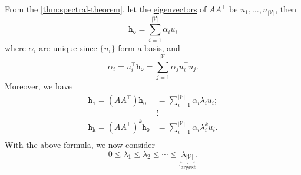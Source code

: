 From the \autoref{thm:spectral-theorem}, let the \hyperref[def:eigenvector]{eigenvectors} of \(A A^{\top} \) be \(u_1, \ldots , u_{\left\vert \mathcal{V} \right\vert } \), then
\[
	\mathtt{h_0} = \sum\limits_{i=1}^{\left\vert \mathcal{V} \right\vert } \alpha_i u_{i}
\]
where \(\alpha_{i}\) are unique since \(\{u_{i}\} \) form a basis, and
\[
	\alpha_{i} = u_{i}^{\top}\mathtt{h_0} = \sum\limits_{j=1}^{\left\vert \mathcal{V} \right\vert } \alpha_{j}u_{i}^{\top}u_{j}.
\]
Moreover, we have
\[
	\begin{split}
		\mathtt{h_1} = (A A^{\top})\mathtt{h_0} &= \sum\limits_{i=1}^{\left\vert \mathcal{V} \right\vert } \alpha_{i} \lambda_{i}u_{i};\\
		&\vdots\\
		\mathtt{h_k} = (A A^{\top})^k\mathtt{h_0} &= \sum\limits_{i=1}^{\left\vert \mathcal{V} \right\vert } \alpha_{i} \lambda_{i}^k u_{i}.\\
	\end{split}
\]
With the above formula, we now consider
\[
	0 \leq \lambda_1 \leq \lambda_2 \leq \cdots \leq \underbrace{\lambda_{\left\vert \mathcal{V} \right\vert}}_{\text{largest}}.
\]
